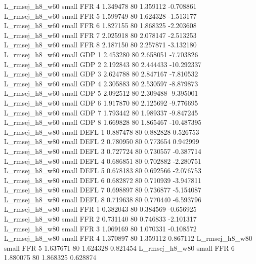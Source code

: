 L_rmsej_h8_w60      small      FFR                 4 1.349478 80       1.359112          -0.708861
L_rmsej_h8_w60      small      FFR                 5 1.599749 80       1.624328          -1.513177
L_rmsej_h8_w60      small      FFR                 6 1.827155 80       1.868325          -2.203608
L_rmsej_h8_w60      small      FFR                 7 2.025918 80       2.078147          -2.513253
L_rmsej_h8_w60      small      FFR                 8 2.187150 80       2.257871          -3.132180
L_rmsej_h8_w60      small      GDP                 1 2.453280 80       2.658051          -7.703826
L_rmsej_h8_w60      small      GDP                 2 2.192843 80       2.444433         -10.292337
L_rmsej_h8_w60      small      GDP                 3 2.624788 80       2.847167          -7.810532
L_rmsej_h8_w60      small      GDP                 4 2.305883 80       2.530597          -8.879873
L_rmsej_h8_w60      small      GDP                 5 2.092512 80       2.309488          -9.395001
L_rmsej_h8_w60      small      GDP                 6 1.917870 80       2.125692          -9.776695
L_rmsej_h8_w60      small      GDP                 7 1.793442 80       1.989337          -9.847245
L_rmsej_h8_w60      small      GDP                 8 1.669828 80       1.865467         -10.487395
L_rmsej_h8_w80      small     DEFL                 1 0.887478 80       0.882828           0.526753
L_rmsej_h8_w80      small     DEFL                 2 0.780950 80       0.773654           0.942999
L_rmsej_h8_w80      small     DEFL                 3 0.727724 80       0.730557          -0.387714
L_rmsej_h8_w80      small     DEFL                 4 0.686851 80       0.702882          -2.280751
L_rmsej_h8_w80      small     DEFL                 5 0.678183 80       0.692566          -2.076753
L_rmsej_h8_w80      small     DEFL                 6 0.682872 80       0.710939          -3.947811
L_rmsej_h8_w80      small     DEFL                 7 0.698897 80       0.736877          -5.154087
L_rmsej_h8_w80      small     DEFL                 8 0.719638 80       0.770440          -6.593796
L_rmsej_h8_w80      small      FFR                 1 0.382043 80       0.384569          -0.656925
L_rmsej_h8_w80      small      FFR                 2 0.731140 80       0.746833          -2.101317
L_rmsej_h8_w80      small      FFR                 3 1.069169 80       1.070331          -0.108572
L_rmsej_h8_w80      small      FFR                 4 1.370897 80       1.359112           0.867112
L_rmsej_h8_w80      small      FFR                 5 1.637671 80       1.624328           0.821454
L_rmsej_h8_w80      small      FFR                 6 1.880075 80       1.868325           0.628874
